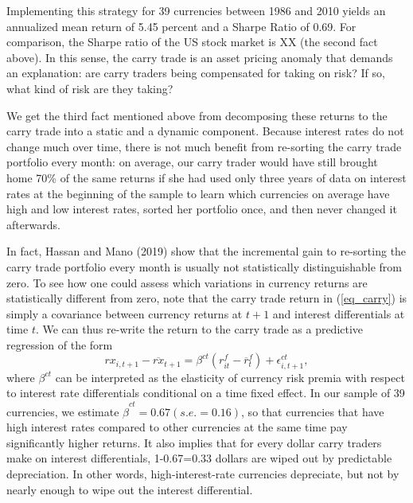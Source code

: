 \documentclass{ar-1col}
\begin{document}
Implementing this strategy for 39 currencies between 1986 and 2010 yields an annualized mean return of 5.45 percent and a Sharpe Ratio of 0.69. For comparison, the Sharpe ratio of the US stock market is XX (the second fact above). In this sense, the carry trade is an asset pricing anomaly that demands an explanation: are carry traders being compensated for taking on risk? If so, what kind of risk are they taking?

We get the third fact mentioned above from decomposing these returns to the carry trade into a static and a dynamic component. Because interest rates do not change much over time, there is not much benefit from re-sorting the carry trade portfolio every month: on average, our carry trader would have still brought home 70\% of the same returns if she had used only three years of data on interest rates at the beginning of the sample to learn which currencies on average have high and low interest rates, sorted her portfolio once, and then never changed it afterwards. 

In fact, Hassan and Mano (2019) show that the incremental gain to re-sorting the carry trade portfolio every month is usually not statistically distinguishable from zero. To see how one could assess which variations in currency returns are statistically different from zero, note that the carry trade return in (\ref{eq_carry}) is simply a covariance between currency returns at $t+1$ and interest differentials at time $t$. We can thus re-write the return to the carry trade as a predictive regression of the form  \begin{equation}
rx_{i,t+1}-\overline{rx}_{t+1}=\beta^{ct}\left( r^f_{it}-\overline{r}^f_{t}\right) +\epsilon
_{i,t+1}^{ct},  \label{eq_ct}
\end{equation} 
where $\beta ^{ct}$ can be interpreted as the elasticity of currency risk premia with respect to interest rate differentials conditional on a time fixed effect. In our sample of 39 currencies, we estimate $\hat{\beta}^{ct}=0.67 (s.e.=0.16)$, so that currencies that have high interest rates compared to other currencies at the same time pay significantly higher returns. It also implies that for every dollar carry traders make on interest differentials, 1-0.67=0.33 dollars are wiped out by predictable depreciation. In other words, high-interest-rate currencies depreciate, but not by nearly enough to wipe out the interest differential.
\end{document}
